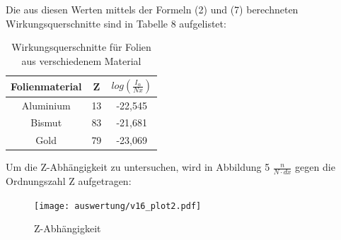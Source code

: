  Die aus diesen Werten mittels der Formeln (2) und (7) berechneten Wirkungsquerschnitte sind in Tabelle 8 aufgelistet:
 
 \begin{table}[H] 
 	\centering
 	\begin{tabular}{c|c c }
 		
 		Folienmaterial & Z & $log(\frac{I_\alpha}{Nx})$ \\ 
 		\hline 
 		
 		Aluminium & 13 & -22,545 \\ 
 		
 		Bismut & 83 & -21,681   \\
 		
 		Gold & 79 & -23,069 \\ 
 		
 	\end{tabular} 
 	\caption{Wirkungsquerschnitte für Folien aus verschiedenem Material} 
 \end{table}
Um die Z-Abhängigkeit zu untersuchen, wird in Abbildung 5 $\frac{n}{N\cdot dx}$ gegen die Ordnungszahl Z aufgetragen: 
\begin{figure}[H]
	\centering
	\texttt{[image: auswertung/v16\_plot2.pdf]}
	\caption{Z-Abhängigkeit}
	\label{img:grafik-dummy}
\end{figure}
